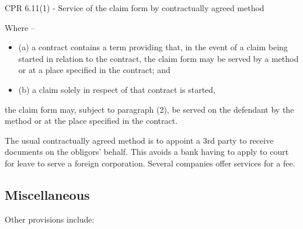 \documentclass[
]{article}
\providecommand{\tightlist}{%
  \setlength{\itemsep}{0pt}\setlength{\parskip}{0pt}}
\newenvironment{env-794f47f9-38df-4a52-b7f1-227d11939e2b}
{
    \savenotes\tcolorbox[blanker,breakable,left=5pt,borderline west={2pt}{-4pt}{green}]
}
{
    \endtcolorbox\spewnotes
}
\begin{document}
\begin{env-794f47f9-38df-4a52-b7f1-227d11939e2b}

CPR 6.11(1) - Service of the claim form by contractually agreed method

Where --

\begin{itemize}
\tightlist
\item
  (a) a contract contains a term providing that, in the event of a claim
  being started in relation to the contract, the claim form may be
  served by a method or at a place specified in the contract; and
\item
  (b) a claim solely in respect of that contract is started,
\end{itemize}

the claim form may, subject to paragraph (2), be served on the defendant
by the method or at the place specified in the contract.

\end{env-794f47f9-38df-4a52-b7f1-227d11939e2b}

The usual contractually agreed method is to appoint a 3rd party to
receive documents on the obligors' behalf. This avoids a bank having to
apply to court for leave to serve a foreign corporation. Several
companies offer services for a fee.

\hypertarget{miscellaneous}{%
\subsection{Miscellaneous}\label{miscellaneous}}

Other provisions include:
\end{document}
